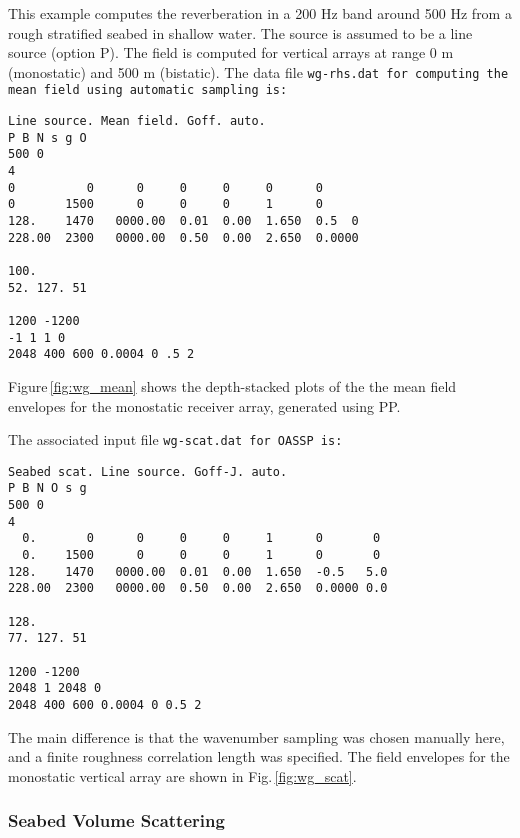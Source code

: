This example computes the reverberation in a 200 Hz band around 500 Hz
from a rough stratified seabed in shallow water. The source is assumed
to be a line source (option P). The field is computed for vertical
arrays at range 0 m (monostatic) and 500 m (bistatic). The data file
\tt wg-rhs.dat \rm for computing the mean field using automatic
sampling is:

\begin{verbatim}
Line source. Mean field. Goff. auto.
P B N s g O 
500 0
4
0          0      0     0     0     0      0
0       1500      0     0     0     1      0 
128.    1470   0000.00  0.01  0.00  1.650  0.5  0
228.00  2300   0000.00  0.50  0.00  2.650  0.0000  	

100.
52. 127. 51

1200 -1200
-1 1 1 0
2048 400 600 0.0004 0 .5 2 
\end{verbatim}


Figure\,\ref{fig:wg_mean} shows the depth-stacked plots of the the mean
field envelopes for the monostatic receiver array, generated using PP. 

The associated input file \tt wg-scat.dat \rm for OASSP is:

\begin{verbatim}
Seabed scat. Line source. Goff-J. auto.
P B N O s g  
500 0
4
  0.       0      0     0     0     1      0       0
  0.    1500      0     0     0     1      0       0
128.    1470   0000.00  0.01  0.00  1.650  -0.5   5.0 
228.00  2300   0000.00  0.50  0.00  2.650  0.0000 0.0 	

128.
77. 127. 51

1200 -1200
2048 1 2048 0
2048 400 600 0.0004 0 0.5 2
\end{verbatim}


The main difference is that the wavenumber sampling was chosen
manually here, and a finite roughness correlation length was
specified. The field envelopes for the monostatic vertical array are
shown in Fig.\,\ref{fig:wg_scat}.

\subsubsection{Seabed Volume Scattering}

